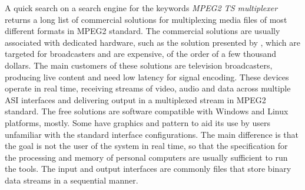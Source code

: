\documentclass[
	12pt,				%
	openright,			%
	twoside,			%
	a4paper,			%
	brazil,
	french,				%
	english
	]{abntex2}
\begin{document}
A quick search on a search engine for the keywords \textit{MPEG2 TS multiplexer} returns a long list of commercial solutions for multiplexing media files of most different formats in MPEG2 standard. The commercial solutions are usually associated with dedicated hardware, such as the solution presented by \cite{harris}, which are targeted for broadcasters and are expensive, of the order of a few thousand dollars. The main customers of these solutions are television broadcasters, producing live content and need low latency for signal encoding. These devices operate in real time, receiving streams of video, audio and data across multiple ASI interfaces and delivering output in a multiplexed stream in MPEG2 standard. The free solutions are software compatible with Windows and Linux platforms, mostly. Some have graphics and pattern to aid its use by users unfamiliar with the standard interface configurations. The main difference is that the goal is not the user of the system in real time, so that the specification for the processing and memory of personal computers are usually sufficient to run the tools. The input and output interfaces are commonly files that store binary data streams in a sequential manner.

\end{document}
